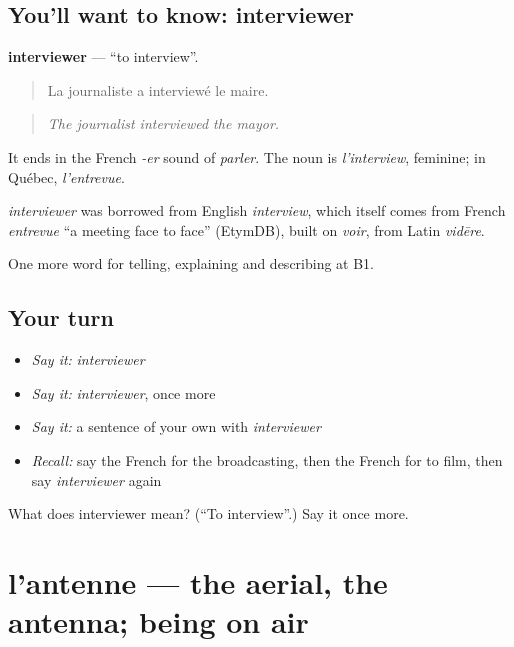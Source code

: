 \subsection*{You'll want to know: interviewer}
\textbf{interviewer} — \textquotedblleft{}to interview\textquotedblright{}.

\begin{quote}
La journaliste a interviewé le maire.
\end{quote}

\begin{quote}
\emph{The journalist interviewed the mayor.}
\end{quote}

It ends in the French \emph{-er} sound of \emph{parler}. The noun is \emph{l'interview}, feminine; in Québec, \emph{l'entrevue}.

\begin{cousinweb}
\emph{interviewer} was borrowed from English \emph{interview}, which itself comes from French \emph{entrevue} \textquotedblleft{}a meeting face to face\textquotedblright{} (EtymDB), built on \emph{voir}, from Latin \emph{vidēre}.
\end{cousinweb}

\begin{grammarlens}[title={What you've built}]
One more word for telling, explaining and describing at B1.
\end{grammarlens}

\subsection*{Your turn}
\begin{itemize}
\raggedright
  \item \emph{Say it:} \emph{interviewer}
  \item \emph{Say it:} \emph{interviewer}, once more
  \item \emph{Say it:} a sentence of your own with \emph{interviewer}
  \item \emph{Recall:} say the French for the broadcasting, then the French for to film, then say \emph{interviewer} again
\end{itemize}

\begin{tcolorbox}[breakable,colback=teal!4,colframe=teal!35!black,title={Before you move on}]
What does interviewer mean? (\textquotedblleft{}To interview\textquotedblright{}.) Say it once more.
\end{tcolorbox}
\section[l'antenne]{l'antenne — the aerial, the antenna; being on air}

